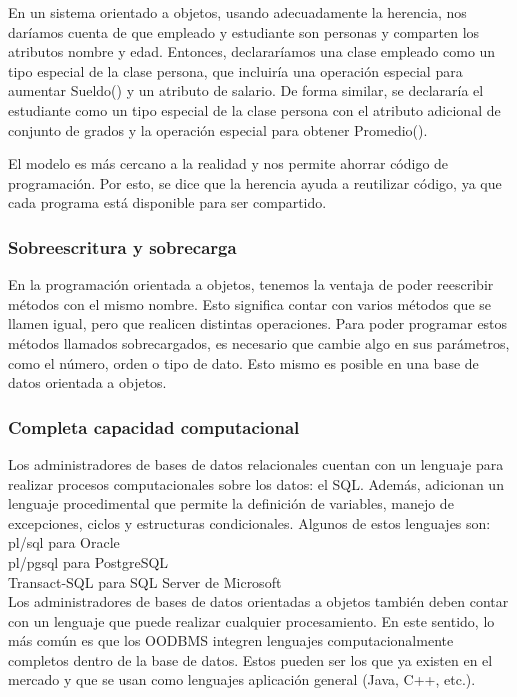 \documentclass[12pts, A3 ,twosides]{article}
\begin{document}
En un sistema orientado a objetos, usando adecuadamente la herencia, nos daríamos cuenta de que empleado y estudiante son personas y comparten los atributos nombre y edad. Entonces, declararíamos una clase empleado como un tipo especial de la clase persona, que incluiría una operación especial para aumentar Sueldo() y un atributo de salario. De forma similar, se declararía el estudiante como un tipo especial de la clase persona con el atributo adicional de conjunto de grados y la operación especial para obtener Promedio().

El modelo es más cercano a la realidad y nos permite ahorrar código de programación. Por esto, se dice que la herencia ayuda a reutilizar código, ya que cada programa está disponible para ser compartido.

\subsubsection{Sobreescritura y sobrecarga}

En la programación orientada a objetos, tenemos la ventaja de poder reescribir métodos con el mismo nombre. Esto significa contar con varios métodos que se llamen igual, pero que realicen distintas operaciones. Para poder programar estos métodos llamados sobrecargados, es necesario que cambie algo en sus parámetros, como el número, orden o tipo de dato. Esto mismo es posible en una base de datos orientada a objetos.
\subsubsection{Completa capacidad computacional}
Los administradores de bases de datos relacionales cuentan con un lenguaje para realizar procesos computacionales sobre los datos: el SQL. Además, adicionan un lenguaje procedimental que permite la definición de variables, manejo de excepciones, ciclos y estructuras condicionales. Algunos de estos lenguajes son:\\
pl/sql para Oracle \\
pl/pgsql para PostgreSQL \\
Transact-SQL para SQL Server de Microsoft\\

Los administradores de bases de datos orientadas a objetos también deben contar con un lenguaje que puede realizar cualquier procesamiento. En este sentido, lo más común es que los OODBMS integren lenguajes computacionalmente completos dentro de la base de datos. Estos pueden ser los que ya existen en el mercado y que se usan como lenguajes aplicación general (Java, C++, etc.).
\end{document}

